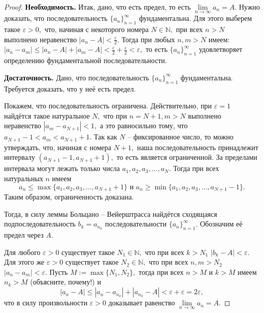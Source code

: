 \begin{proof}
    \textbf{Необходимость.} Итак, дано, что есть
    предел, то есть
    $\lim\limits_{n\rightarrow\infty}a_n=A.$
    Нужно доказать, что последовательность
    $\{a_n\}_{n=1}^{\infty}$ фундаментальна.
    Для этого выберем такое $\varepsilon>0,$
    что, начиная с некоторого номера
    $N\in\mathbb{N},$ при всех
    $n>N$
    выполнено неравенство $|a_n-A|<
        \frac{\varepsilon}{2}.$ Тогда при любых
    $n, m>N$ имеем:
    $|a_n-a_m|\leq |a_n-A|+|a_m-A|<
        \frac{\varepsilon}{2}+\frac{\varepsilon}{2}
        <\varepsilon,$ то есть
    $\{a_n\}_{n=1}^{\infty}$ удовлетворяет
    определению фундаментальной последовательности.

    \textbf{Достаточность.} Дано, что
    последовательность $\{a_n\}_{n=1}^{\infty}$
    фундаментальна. Требуется доказать, что у неё
    есть предел.

    Покажем, что последовательность ограничена.
    Действительно, при $\varepsilon=1$ найдётся
    такое натуральное $N,$ что при
    $n=N+1, m>N$ выполнено неравенство
    $|a_m-a_{N+1}|<1,$ а это равносильно тому, что
    $a_{N+1}-1<a_m<a_{N+1}+1.$ Так как
    $N$ -- фиксированное число, то можно
    утверждать, что, начиная с номера
    $N+1,$ наша последовательность
    принадлежит интервалу
    $(a_{N+1}-1, a_{N+1}+1),$ то есть
    является ограниченной.
    За пределами интервала могут лежать
    только числа $a_1, a_2,
        a_3, ..., a_N.$
    Тогда при всех натуральных
    $n$ имеем $$a_n\leq\max\{a_1, a_2,
        a_3, ..., a_{N+1}+1\}\textrm{ и }
        a_n\geq\min\{a_1, a_2,
        a_3, ..., a_{N+1}-1\}.$$ Таким образом,
    ограниченность доказана.

    Тогда, в силу леммы Больцано -- Вейерштрасса
    найдётся сходящаяся подпоследовательность
    $b_k=a_{n_k}$ последовательности
    $\{a_n\}_{n=1}^{\infty}.$ Обозначим
    её предел через $A.$

    Для любого $\varepsilon>0$ существует
    такое $N_1\in\mathbb{N},$
    что при всех $k>N_1$ $|b_k-A|<\varepsilon.$
    Для этого же $\varepsilon>0$ существует
    такое $N_2\in\mathbb{N},$
    что при всех $n, m>N_2$ $|a_n-a_m|<
        \varepsilon.$ Пусть
    $M:=\max\{N_1, N_2\},$ тогда
    при всех
    $n>M$ и $k>M$ имеем $n_k>M$
    (объясните, почему!) и
    $$
        |a_n-A|\leq|a_n-a_{n_k}|+|a_{n_k}-A|<
        \varepsilon+\varepsilon=2\varepsilon,
    $$
    что в силу произвольности $\varepsilon>0$
    доказывает равенство
    $\lim\limits_{n\rightarrow\infty}a_n=A.$
\end{proof}

